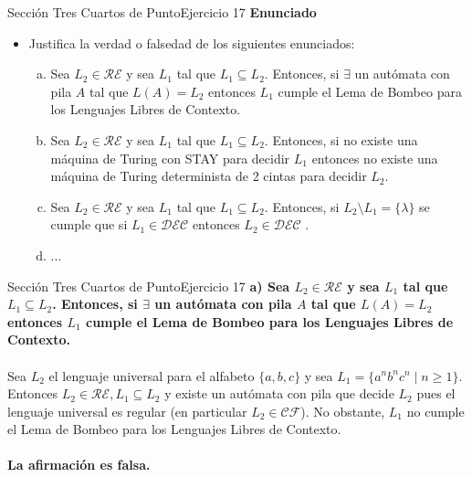 \documentclass[10pt, envcountsect, presentation, aspectratio=169]{beamer}
\newcommand{\ld}{\ensuremath{\mathcal {DEC}}}
\newcommand{\lr}{\ensuremath{\mathcal {RE}}}
\begin{document}
\begin{frame}{Sección Tres Cuartos de Punto}{Ejercicio 17}
    \textbf{Enunciado}
    \begin{itemize}
        \item Justifica la verdad o falsedad de los siguientes enunciados:
        \begin{enumerate}[a)]
            \item Sea $L_2 \in \lr$ y sea $L_1$ tal que $L_1 \subseteq L_2$. Entonces, si $\exists$ un autómata con pila $A$ tal que $L(A)=L_2$ entonces $L_1$ cumple el Lema de Bombeo para los Lenguajes Libres de Contexto. 
            \item Sea $L_2 \in \lr$ y sea $L_1$ tal que $L_1 \subseteq L_2$. Entonces, si no  existe una máquina de Turing con  STAY para decidir $L_1$ entonces no existe una máquina de Turing determinista de 2 cintas para decidir $L_2$.
            \item Sea $L_2 \in \lr$ y sea $L_1$ tal que $L_1 \subseteq L_2$. Entonces, si $L_2 \setminus L_1=\{\lambda\}$ se cumple que si $L_1 \in \ld$ entonces $L_2 \in \ld$ .
            \item ...
        \end{enumerate}
    \end{itemize}
\end{frame}


\begin{frame}{Sección Tres Cuartos de Punto}{Ejercicio 17}
    \textbf{a) Sea $L_2 \in \lr$ y sea $L_1$ tal que $L_1 \subseteq L_2$. Entonces, si $\exists$ un autómata con pila $A$ tal que $L(A)=L_2$ entonces $L_1$ cumple el Lema de Bombeo para los Lenguajes Libres de Contexto.}\\~\\
    Sea $L_2$ el lenguaje universal para el alfabeto $\{a,b,c\}$ y sea $L_1=\{a^n b^n c^n \mid n \geq 1\}$.
    Entonces $L_2 \in \mathcal{RE}, L_1 \subseteq L_2$ y existe un autómata con pila que decide $L_2$ pues el lenguaje universal es regular (en particular $L_2 \in \mathcal{CF}$).
    No obstante, $L_1$ no cumple el Lema de Bombeo para los Lenguajes Libres de Contexto.\\~\\
    \textbf{La afirmación es falsa.}
\end{frame}

\end{document}

